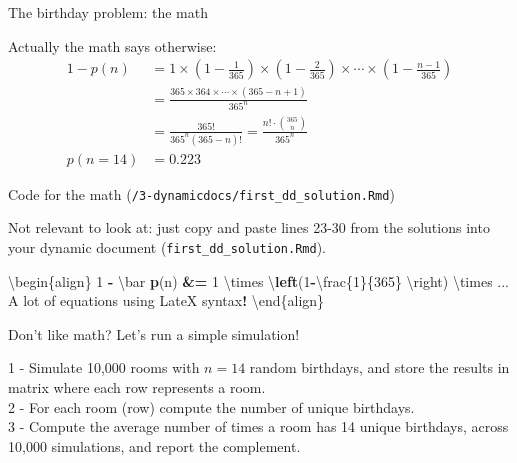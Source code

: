 \documentclass[ignorenonframetext,]{beamer}
\newenvironment{Shaded}{\begin{snugshade}}{\end{snugshade}}
\newcommand{\DecValTok}[1]{\textcolor[rgb]{0.00,0.00,0.81}{#1}}
\newcommand{\ErrorTok}[1]{\textcolor[rgb]{0.64,0.00,0.00}{\textbf{#1}}}
\newcommand{\KeywordTok}[1]{\textcolor[rgb]{0.13,0.29,0.53}{\textbf{#1}}}
\newcommand{\NormalTok}[1]{#1}
\newcommand{\OperatorTok}[1]{\textcolor[rgb]{0.81,0.36,0.00}{\textbf{#1}}}
\newcommand{\StringTok}[1]{\textcolor[rgb]{0.31,0.60,0.02}{#1}}
\begin{document}
\begin{frame}{The birthday problem: the math}
\protect\hypertarget{the-birthday-problem-the-math}{}

Actually the math says otherwise: \begin{align} 
 1 -  p(n) &= 1 \times \left(1-\frac{1}{365}\right) \times \left(1-\frac{2}{365}\right) \times \cdots \times \left(1-\frac{n-1}{365}\right) \nonumber  \\  &= \frac{ 365 \times 364 \times \cdots \times (365-n+1) }{ 365^n } \nonumber \\ &= \frac{ 365! }{ 365^n (365-n)!} = \frac{n!\cdot\binom{365}{n}}{365^n}\\
p(n= 14) &= 0.223  \nonumber
\end{align}

\end{frame}

\begin{frame}[fragile]{Code for the math
(\texttt{/3-dynamicdocs/first\_dd\_solution.Rmd})}
\protect\hypertarget{code-for-the-math-3-dynamicdocsfirst_dd_solution.rmd}{}

Not relevant to look at: just copy and paste lines 23-30 from the
solutions into your dynamic document (\texttt{first\_dd\_solution.Rmd}).

\begin{Shaded}
\begin{Highlighting}[]
\NormalTok{\textbackslash{}begin\{align\} }
 \DecValTok{1} \OperatorTok{-}\StringTok{ }\NormalTok{\textbackslash{}bar }\KeywordTok{p}\NormalTok{(n) }\OperatorTok{&}\ErrorTok{=}\StringTok{ }\DecValTok{1}\NormalTok{ \textbackslash{}times \textbackslash{}}\KeywordTok{left}\NormalTok{(}\DecValTok{1}\OperatorTok{-}\NormalTok{\textbackslash{}frac\{}\DecValTok{1}\NormalTok{\}\{}\DecValTok{365}\NormalTok{\}}
\NormalTok{                                 \textbackslash{}right) }
\NormalTok{ \textbackslash{}times ...}
\NormalTok{ A lot of equations using LateX syntax}\OperatorTok{!}
\NormalTok{\textbackslash{}end\{align\}}
\end{Highlighting}
\end{Shaded}

\end{frame}

\begin{frame}{Don't like math? Let's run a simple simulation!}
\protect\hypertarget{dont-like-math-lets-run-a-simple-simulation}{}

1 - Simulate 10,000 rooms with \(n = 14\) random birthdays, and store
the results in matrix where each row represents a room.\\
2 - For each room (row) compute the number of unique birthdays.\\
3 - Compute the average number of times a room has 14 unique birthdays,
across 10,000 simulations, and report the complement.

\end{frame}
\end{document}
